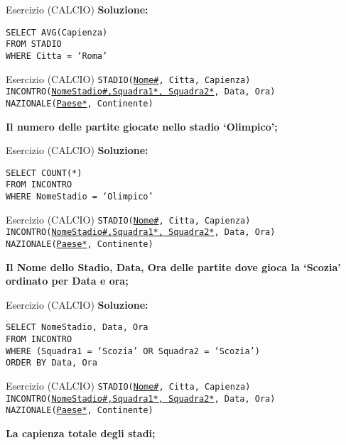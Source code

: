 \begin{frame}{Esercizio (CALCIO)}
    \textbf{Soluzione:}
    \vspace{1em}
    
    \texttt{SELECT AVG(Capienza)\\FROM STADIO\\WHERE Citta = `Roma'}
\end{frame}
\begin{frame}{Esercizio (CALCIO) } 
    \texttt{STADIO(\underline{Nome\#}, Citta, Capienza)\\
    INCONTRO(\underline{NomeStadio\#,Squadra1*, Squadra2*}, Data, Ora)\\
    NAZIONALE(\underline{Paese*}, Continente)}
    \vspace{1em}
    
    \textbf{Il numero delle partite giocate nello stadio `Olimpico';}
\end{frame}

\begin{frame}{Esercizio (CALCIO)}
    \textbf{Soluzione:}
    \vspace{1em}
    
    \texttt{SELECT COUNT(*)\\FROM INCONTRO\\WHERE NomeStadio = `Olimpico'}
\end{frame}
\begin{frame}{Esercizio (CALCIO) } 
    \texttt{STADIO(\underline{Nome\#}, Citta, Capienza)\\
    INCONTRO(\underline{NomeStadio\#,Squadra1*, Squadra2*}, Data, Ora)\\
    NAZIONALE(\underline{Paese*}, Continente)}
    \vspace{1em}
    
    \textbf{Il Nome dello Stadio, Data, Ora delle partite dove gioca la `Scozia' ordinato per Data e ora;}
\end{frame}

\begin{frame}{Esercizio (CALCIO)}
    \textbf{Soluzione:}
    \vspace{1em}
    
    \texttt{SELECT NomeStadio, Data, Ora\\FROM INCONTRO\\WHERE (Squadra1 = `Scozia' OR Squadra2 = `Scozia') \\ORDER BY Data, Ora}
\end{frame}
\begin{frame}{Esercizio (CALCIO) } 
    \texttt{STADIO(\underline{Nome\#}, Citta, Capienza)\\
    INCONTRO(\underline{NomeStadio\#,Squadra1*, Squadra2*}, Data, Ora)\\
    NAZIONALE(\underline{Paese*}, Continente)}
    \vspace{1em}
    
    \textbf{La capienza totale degli stadi;}
\end{frame}

